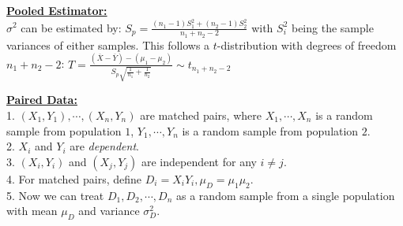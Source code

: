 \documentclass[10pt,landscape]{article}
\begin{document}
\begin{multicols*}{3}



\textbf{\underline{Pooled Estimator:}} \\ 
$\sigma^2$ can be estimated by: $S_p = \frac{(n_1 - 1)S_1^2 + (n_2 - 1)S_2^2}{n_1 + n_2 - 2}$
with $S_i^2$ being the sample variances of either samples. This follows a $t$-distribution with degrees of freedom $n_1 + n_2 - 2$: 
$T = \frac{(\overline{X} - \overline{Y}) - (\mu_1 - \mu_2)}{S_p\sqrt{\frac{1}{n_1} + \frac{1}{n_2}}} \sim t_{n_1 + n_2 - 2}$

\textbf{\underline{Paired Data:}} \\ 
1. $(X_1,Y_1),\cdots ,(X_n,Y_n)$ are matched pairs, where $X_1,\cdots, X_n$ is a random sample from
population $1$, $Y_1, \cdots, Y_n$ is a random sample from population $2$. \\
2. $X_i$ and $Y_i$ are \textit{dependent}. \\
3. $(X_i, Y_i)$ and $(X_j, Y_j)$ are independent for any $i \neq j$. \\
4. For matched pairs, define $D_i = X_i Y_i, \mu_D = \mu_1  \mu_2$. \\
5. Now we can treat $D_1,D_2,\cdots,D_n$ as a random sample from a single population with mean $\mu_D$ and variance $\sigma_D^2$. \\ 


\end{multicols*}
\end{document}
